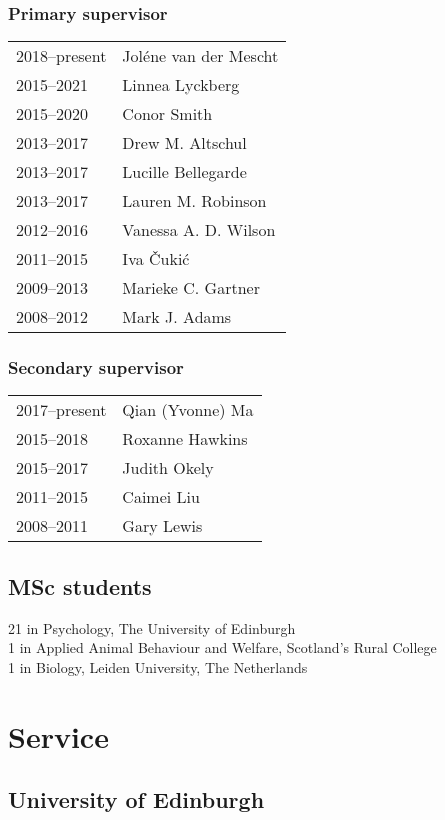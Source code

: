 \documentclass[11pt]{article}
\begin{document}
\subsubsection*{Primary supervisor}
\begin{tabular}{p{3cm}p{12cm}}
2018--present & Joléne van der Mescht \\
2015--2021 & Linnea Lyckberg \\
2015--2020 & Conor Smith \\
2013--2017 & Drew M. Altschul \\
2013--2017 & Lucille Bellegarde \\
2013--2017 & Lauren M. Robinson \\
2012--2016 & Vanessa A. D. Wilson \\
2011--2015 & Iva Čukić \\
2009--2013 & Marieke C. Gartner \\
2008--2012 & Mark J. Adams
\end{tabular}

\subsubsection*{Secondary supervisor}

\begin{tabular}{p{3cm}p{12cm}}
2017--present & Qian (Yvonne) Ma \\
2015--2018 & Roxanne Hawkins \\
2015--2017 & Judith Okely \\
2011--2015 & Caimei Liu \\
2008--2011 & Gary Lewis
\end{tabular}

\subsection*{MSc students}
21 in Psychology, The University of Edinburgh \\
1 in Applied Animal Behaviour and Welfare, Scotland's Rural College \\
1 in Biology, Leiden University, The Netherlands

\section*{Service}
\subsection*{University of Edinburgh}
\end{document}
